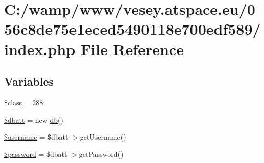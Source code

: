 \hypertarget{056c8de75e1eced5490118e700edf589_2index_8php}{\section{C\-:/wamp/www/vesey.atspace.\-eu/056c8de75e1eced5490118e700edf589/index.php File Reference}
\label{056c8de75e1eced5490118e700edf589_2index_8php}
}
\subsection*{Variables}
\begin{DoxyCompactItemize}
\item 
\hyperlink{056c8de75e1eced5490118e700edf589_2index_8php_a252ba022809910ea710a068fc1bab657}{\$class} = 288
\item 
\hyperlink{056c8de75e1eced5490118e700edf589_2index_8php_a91a28d35770d3a47412dce6c8059f374}{\$dbatt} = new \hyperlink{classdb}{db}()
\item 
\hyperlink{056c8de75e1eced5490118e700edf589_2index_8php_a0eb82aa5f81cf845de4b36cd653c42cf}{\$username} = \$dbatt-\/$>$get\-Username()
\item 
\hyperlink{056c8de75e1eced5490118e700edf589_2index_8php_a607686ef9f99ea7c42f4f3dd3dbb2b0d}{\$password} = \$dbatt-\/$>$get\-Password()
\end{DoxyCompactItemize}


